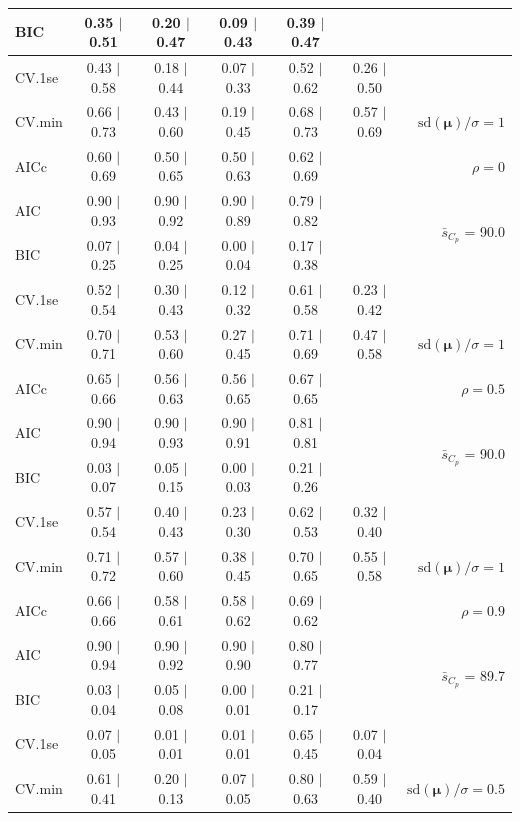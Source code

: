 \documentclass[12pt]{article}
\newcommand{\mr}[1]{\mathrm{#1}}
\newcommand{\bm}[1]{\mathbf{#1}}
\begin{document}
\begin{table}[p]
\begin{center}
\begin{tabular}{l*{5}{c}|r}
BIC & 0.35 $\mid$ 0.51 & 0.20 $\mid$ 0.47 & 0.09 $\mid$ 0.43 & 0.39 $\mid$ 0.47 & & \\
 \hline 
CV.1se & 0.43 $\mid$ 0.58 & 0.18 $\mid$ 0.44 & 0.07 $\mid$ 0.33 & 0.52 $\mid$ 0.62 & 0.26 $\mid$ 0.50 &\\
CV.min & 0.66 $\mid$ 0.73 & 0.43 $\mid$ 0.60 & 0.19 $\mid$ 0.45 & 0.68 $\mid$ 0.73 & 0.57 $\mid$ 0.69 &  $\mr{sd}(\bm{\mu})/\sigma=1$ \\
AICc & 0.60 $\mid$ 0.69 & 0.50 $\mid$ 0.65 & 0.50 $\mid$ 0.63 & 0.62 $\mid$ 0.69 & & $\rho=0$ \\
AIC & 0.90 $\mid$ 0.93 & 0.90 $\mid$ 0.92 & 0.90 $\mid$ 0.89 & 0.79 $\mid$ 0.82 & & \multirow{2}{*}{$\bar{s}_{C_p}$ = 90.0} \\
BIC & 0.07 $\mid$ 0.25 & 0.04 $\mid$ 0.25 & 0.00 $\mid$ 0.04 & 0.17 $\mid$ 0.38 & & \\
 \hline 
CV.1se & 0.52 $\mid$ 0.54 & 0.30 $\mid$ 0.43 & 0.12 $\mid$ 0.32 & 0.61 $\mid$ 0.58 & 0.23 $\mid$ 0.42 &\\
CV.min & 0.70 $\mid$ 0.71 & 0.53 $\mid$ 0.60 & 0.27 $\mid$ 0.45 & 0.71 $\mid$ 0.69 & 0.47 $\mid$ 0.58 &  $\mr{sd}(\bm{\mu})/\sigma=1$ \\
AICc & 0.65 $\mid$ 0.66 & 0.56 $\mid$ 0.63 & 0.56 $\mid$ 0.65 & 0.67 $\mid$ 0.65 & & $\rho=0.5$ \\
AIC & 0.90 $\mid$ 0.94 & 0.90 $\mid$ 0.93 & 0.90 $\mid$ 0.91 & 0.81 $\mid$ 0.81 & & \multirow{2}{*}{$\bar{s}_{C_p}$ = 90.0} \\
BIC & 0.03 $\mid$ 0.07 & 0.05 $\mid$ 0.15 & 0.00 $\mid$ 0.03 & 0.21 $\mid$ 0.26 & & \\
 \hline 
CV.1se & 0.57 $\mid$ 0.54 & 0.40 $\mid$ 0.43 & 0.23 $\mid$ 0.30 & 0.62 $\mid$ 0.53 & 0.32 $\mid$ 0.40 &\\
CV.min & 0.71 $\mid$ 0.72 & 0.57 $\mid$ 0.60 & 0.38 $\mid$ 0.45 & 0.70 $\mid$ 0.65 & 0.55 $\mid$ 0.58 &  $\mr{sd}(\bm{\mu})/\sigma=1$ \\
AICc & 0.66 $\mid$ 0.66 & 0.58 $\mid$ 0.61 & 0.58 $\mid$ 0.62 & 0.69 $\mid$ 0.62 & & $\rho=0.9$ \\
AIC & 0.90 $\mid$ 0.94 & 0.90 $\mid$ 0.92 & 0.90 $\mid$ 0.90 & 0.80 $\mid$ 0.77 & & \multirow{2}{*}{$\bar{s}_{C_p}$ = 89.7} \\
BIC & 0.03 $\mid$ 0.04 & 0.05 $\mid$ 0.08 & 0.00 $\mid$ 0.01 & 0.21 $\mid$ 0.17 & & \\
 \hline 
CV.1se & 0.07 $\mid$ 0.05 & 0.01 $\mid$ 0.01 & 0.01 $\mid$ 0.01 & 0.65 $\mid$ 0.45 & 0.07 $\mid$ 0.04 &\\
CV.min & 0.61 $\mid$ 0.41 & 0.20 $\mid$ 0.13 & 0.07 $\mid$ 0.05 & 0.80 $\mid$ 0.63 & 0.59 $\mid$ 0.40 &  $\mr{sd}(\bm{\mu})/\sigma=0.5$ \\

\end{tabular}
\end{center}
\end{table}
\end{document}
